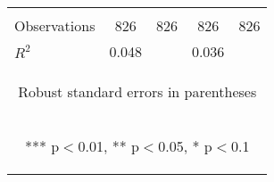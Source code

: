 \begin{center}
\begin{tabular}{lcccc}
\vspace{4pt} & \begin{footnotesize}\end{footnotesize} & \begin{footnotesize}\end{footnotesize} & \begin{footnotesize}\end{footnotesize} & \begin{footnotesize}\end{footnotesize} \\
Observations & 826 & 826 & 826 & 826 \\
 $R^2$ & 0.048 &  & 0.036 &  \\ \hline
\multicolumn{5}{c}{\begin{footnotesize} Robust standard errors in parentheses\end{footnotesize}} \\
\multicolumn{5}{c}{\begin{footnotesize} *** p$<$0.01, ** p$<$0.05, * p$<$0.1\end{footnotesize}} \\
\end{tabular}
\end{center}
